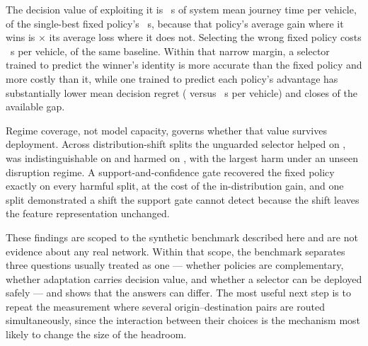 The decision value of exploiting it is \NumHeadroom~s of system mean journey
time per vehicle, \NumHeadroomPct{} of the single-best fixed policy's
\NumSBSMeanCost~s, because that policy's average gain where it wins is
\NumAsymRatio$\times$ its average loss where it does not. Selecting the wrong
fixed policy costs \NumFixedPenAbsPOne~s per vehicle, \NumFixedPenPctAbsPOne{}
of the same baseline. Within that narrow margin, a selector trained to predict
the winner's identity is more accurate than the fixed policy and more costly
than it, while one trained to predict each policy's advantage has substantially
lower mean decision regret (\NumBFourRegret{} versus \NumBOneRegret~s per
vehicle) and closes \NumBFourGapClosed{} of the available gap.

Regime coverage, not model capacity, governs whether that value survives
deployment. Across \NumOODNTotal{} distribution-shift splits the unguarded
selector helped on \NumOODNHelps{}, was indistinguishable on \NumOODNNeutral{}
and harmed on \NumOODNHarms{}, with the largest harm under an unseen disruption
regime. A support-and-confidence gate recovered the fixed policy exactly on
every harmful split, at the cost of the in-distribution gain, and one split
demonstrated a shift the support gate cannot detect because the shift leaves the
feature representation unchanged.

These findings are scoped to the synthetic benchmark described here and are not
evidence about any real network. Within that scope, the benchmark separates
three questions usually treated as one --- whether policies are complementary,
whether adaptation carries decision value, and whether a selector can be
deployed safely --- and shows that the answers can differ. The most useful next
step is to repeat the measurement where several origin--destination pairs are
routed simultaneously, since the interaction between their choices is the
mechanism most likely to change the size of the headroom.
